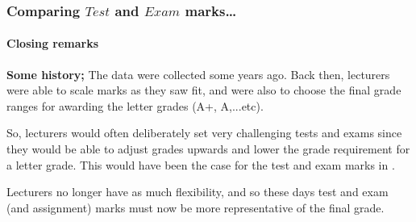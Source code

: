 \documentclass{beamer}\usepackage[]{graphicx}\usepackage[]{xcolor}
\begin{document}
\begin{frame}[fragile]
\frametitle{Comparing $Test$ and $Exam$ marks\ldots}
\framesubtitle{Closing remarks}

{\bf Some history;} The  data were collected some years ago. Back then, lecturers were able to scale marks as they saw fit, and were also to choose the final grade ranges for awarding the letter grades (A+, A,...etc).

So, lecturers would often deliberately set very challenging tests and exams since they would be able to adjust grades upwards and lower the grade requirement for a letter grade. This would have been the case for the test and exam marks in . 

Lecturers no longer have as much flexibility, and so these days test and exam (and assignment) marks must now be more representative of the final grade.

\end{frame}

\end{document}
